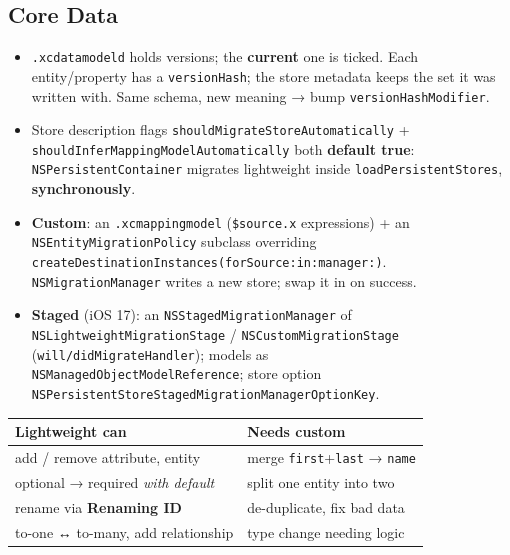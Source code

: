 \documentclass[8pt]{extarticle}
\begin{document}
\begin{multicols}{2}
\raggedright

\section{Core Data}
\begin{itemize}
  \item \texttt{.xcdatamodeld} holds versions; the \textbf{current} one is ticked. Each
        entity/property has a \texttt{versionHash}; the store metadata keeps the set it was
        written with. Same schema, new meaning → bump \texttt{versionHashModifier}.
  \item Store description flags \texttt{shouldMigrateStoreAutomatically} +
        \texttt{shouldInferMappingModelAutomatically} both \textbf{default true}:
        \texttt{NSPersistentContainer} migrates lightweight inside
        \texttt{loadPersistentStores}, \textbf{synchronously}.
  \item \textbf{Custom}: an \texttt{.xcmappingmodel} (\texttt{\$source.x} expressions) +
        an \texttt{NSEntityMigrationPolicy} subclass overriding\\
        \texttt{createDestinationInstances(forSource:in:manager:)}.
        \texttt{NSMigrationManager} writes a new store; swap it in on success.
  \item \textbf{Staged} (iOS 17): an \texttt{NSStagedMigrationManager} of
        \texttt{NSLightweightMigrationStage} / \texttt{NSCustomMigrationStage}
        (\texttt{will/didMigrateHandler}); models as\\
        \texttt{NSManagedObjectModelReference}; store option\\
        \texttt{NSPersistentStoreStagedMigrationManagerOptionKey}.
\end{itemize}

{\footnotesize\setlength{\tabcolsep}{3pt}
\begin{tabular}{@{}L{37mm}L{37mm}@{}}
\toprule
\textbf{Lightweight can} & \textbf{Needs custom} \\
\midrule
add / remove attribute, entity & merge \texttt{first}+\texttt{last} → \texttt{name} \\
optional → required \emph{with default} & split one entity into two \\
rename via \textbf{Renaming ID} & de-duplicate, fix bad data \\
to-one ↔ to-many, add relationship & type change needing logic \\
\bottomrule
\end{tabular}}


\end{multicols}
\end{document}
